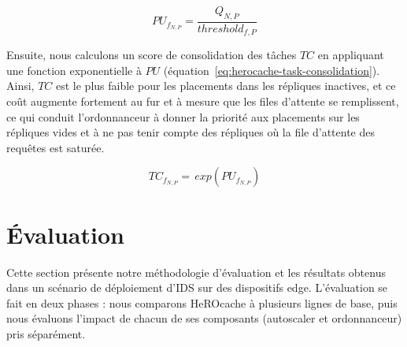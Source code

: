 \begin{equation}
    PU_{f_{N, P}} = \frac{Q_{N, P}}{threshold_{f, P}}
\label{eq:herocache-platform-usage}
\end{equation}

Ensuite, nous calculons un score de consolidation des tâches $TC$ en appliquant une fonction exponentielle à $PU$ (équation~\ref{eq:herocache-task-consolidation}). Ainsi, $TC$ est le plus faible pour les placements dans les répliques inactives, et ce coût augmente fortement au fur et à mesure que les files d'attente se remplissent, ce qui conduit l'ordonnanceur à donner la priorité aux placements sur les répliques vides et à ne pas tenir compte des répliques où la file d'attente des requêtes est saturée.

\begin{equation}
    TC_{{f}_{N, P}} = \, exp(PU_{f_{N, P}})
\label{eq:herocache-task-consolidation}
\end{equation}

\section{Évaluation}
\label{section:herocache-evaluation}

Cette section présente notre méthodologie d'évaluation et les résultats obtenus dans un scénario de déploiement d'IDS sur des dispositifs edge. L'évaluation se fait en deux phases : nous comparons HeROcache à plusieurs lignes de base, puis nous évaluons l'impact de chacun de ses composants (autoscaler et ordonnanceur) pris séparément.

